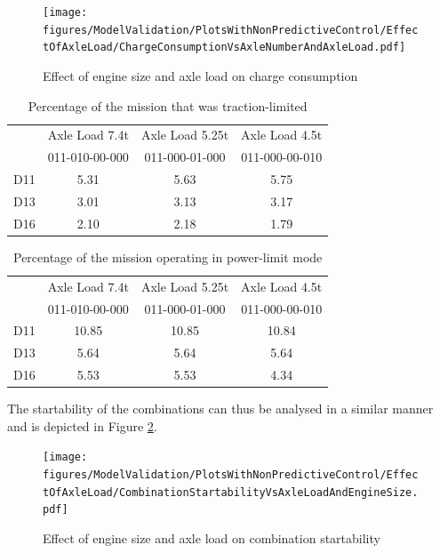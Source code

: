 \documentclass[ExampleMasters.tex]{subfiles}
\begin{document}
\begin{figure}
\centering
\texttt{[image: figures/ModelValidation/PlotsWithNonPredictiveControl/EffectOfAxleLoad/ChargeConsumptionVsAxleNumberAndAxleLoad.pdf]}
\caption{Effect of engine size and axle load on charge consumption}
\label{chargeEngineSizeAxleLoad}
\end{figure}
\begin{table}
\centering
\begin{tabular}{|c|c|c|c|}
\hline
& Axle Load 7.4t & Axle Load 5.25t & Axle Load 4.5t \\
& 011-010-00-000 & 011-000-01-000 & 011-000-00-010 \\
\hline
D11 & 5.31 & 5.63 & 5.75 \\
\hline
D13 & 3.01 & 3.13 & 3.17 \\
\hline
D16 & 2.10 & 2.18 & 1.79 \\
\hline
\end{tabular}
\caption{Percentage of the mission that was traction-limited}
\label{table:tractionLimitMode}
\end{table}
\begin{table}
\centering
\begin{tabular}{|c|c|c|c|}
\hline
& Axle Load 7.4t & Axle Load 5.25t & Axle Load 4.5t \\
& 011-010-00-000 & 011-000-01-000 & 011-000-00-010 \\
\hline
D11 & 10.85 & 10.85 & 10.84 \\
\hline
D13 & 5.64 & 5.64 & 5.64 \\
\hline
D16 & 5.53 & 5.53 & 4.34 \\
\hline
\end{tabular}
\caption{Percentage of the mission operating in power-limit mode}
\label{table:powerLimitMode}
\end{table}
The startability of the combinations can thus be analysed in a similar manner and is depicted in Figure \ref{startabilityEngineAxleLoad}.\\
\begin{figure}
\centering
\texttt{[image: figures/ModelValidation/PlotsWithNonPredictiveControl/EffectOfAxleLoad/CombinationStartabilityVsAxleLoadAndEngineSize.pdf]}
\caption{Effect of engine size and axle load on combination startability}
\label{startabilityEngineAxleLoad}
\end{figure}
\end{document}
